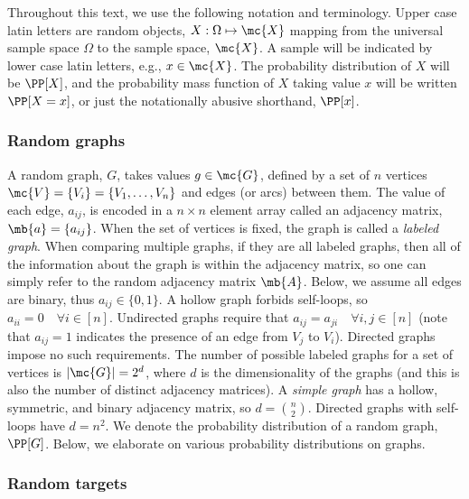 Throughout this text, we use the following notation and terminology.  Upper case latin letters are random objects, $X: \Omega \mapsto \mc{X}$ mapping from the universal sample space $\Omega$ to the sample space, $\mc{X}$.  A sample will be indicated by lower case latin letters, e.g., $x \in \mc{X}$.  The probability distribution of $X$ will be $\PP[X]$, and the probability mass function of $X$ taking value $x$ will be written $\PP[X=x]$, or just the notationally abusive shorthand, $\PP[x]$. 



\subsubsection{Random graphs} %
\label{sec:random_graphs}

A random graph, $G$, takes values $g \in \mc{G}$, defined by a set of $n$ vertices $\mc{V}=\{V_i\}=\{V_1,\ldots,V_n\}$ and edges (or arcs) between them. The value of each edge, $a_{ij}$, is encoded in a $n \times n$ element array called an adjacency matrix, $\mb{a}=\{a_{ij}\}$.  When the set of vertices is fixed, the graph is called a \emph{labeled graph}.  When comparing multiple graphs, if they are all labeled graphs, then all of the information about the graph is within the adjacency matrix, so one can simply refer to the random adjacency matrix $\mb{A}$.   Below, we assume all edges are binary, thus $a_{ij} \in \{0,1\}$. A hollow graph forbids self-loops, so $a_{ii}=0\quad \forall i \in [n]$. Undirected graphs require that $a_{ij}=a_{ji}\quad \forall i,j \in [n]$ (note that $a_{ij}=1$ indicates the presence of an edge from $V_j$ to $V_i$). Directed graphs impose no such requirements.  The number of possible labeled graphs for a set of vertices is $|\mc{G}|=2^d$, where $d$ is the dimensionality of the graphs (and this is also the number of distinct adjacency matrices).  A \emph{simple graph} has a hollow, symmetric, and binary adjacency matrix, so $d={n \choose 2}$.  Directed graphs with self-loops have $d=n^2$.  We denote the probability distribution of a random graph, $\PP[G]$.  Below, we elaborate on various probability distributions on graphs.   



\subsubsection{Random targets} %
\label{ssub:random_targets}

